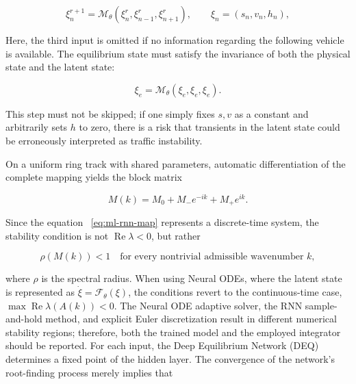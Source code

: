 \documentclass[11pt,a4paper,openany]{book}
\numberwithin{equation}{chapter}
\numberwithin{figure}{chapter}
\numberwithin{table}{chapter}
\begin{document}
\begin{equation}
\xi_n^{r+1}=\mathcal M_\theta
\!\left(\xi_n^r,\xi_{n-1}^r,\xi_{n+1}^r\right),
\qquad \xi_n=(s_n,v_n,h_n),
\label{eq:ml-rnn-map}
\end{equation}

Here, the third input is omitted if no information regarding the following vehicle is available. The equilibrium state must satisfy the invariance of both the physical state and the latent state:

\begin{equation}
\xi_e=\mathcal M_\theta(\xi_e,\xi_e,\xi_e).
\label{eq:ml-hidden-equilibrium}
\end{equation}

This step must not be skipped; if one simply fixes $s,v$ as a constant and arbitrarily sets $h$ to zero, there is a risk that transients in the latent state could be erroneously interpreted as traffic instability.




On a uniform ring track with shared parameters, automatic differentiation of the complete mapping yields the block matrix

\begin{equation}
M(k)=M_0+M_-e^{-ik}+M_+e^{ik}.
\label{eq:ml-discrete-symbol}
\end{equation}

Since the equation ~\eqref{eq:ml-rnn-map} represents a discrete-time system, the stability condition is not $\operatorname{Re}\lambda<0$, but rather

\begin{equation}
\rho\!\left(M(k)\right)<1
\quad\text{for every nontrivial admissible wavenumber }k,
\label{eq:ml-unit-disk}
\end{equation}

where $\rho$ is the spectral radius. When using Neural ODEs, where the latent state is represented as $\dot\xi=\mathcal F_\theta(\xi)$, the conditions revert to the continuous-time case, $\max\operatorname{Re}\lambda(A(k))<0$. The Neural ODE adaptive solver, the RNN sample-and-hold method, and explicit Euler discretization result in different numerical stability regions; therefore, both the trained model and the employed integrator should be reported. For each input, the Deep Equilibrium Network (DEQ) determines a fixed point of the hidden layer. The convergence of the network's root-finding process merely implies that
\end{document}
